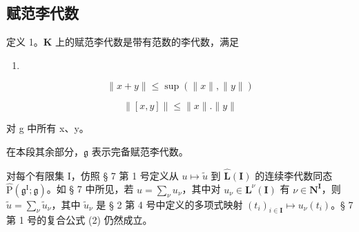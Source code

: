 \subsection{赋范李代数}

定义 1。\(\mathbf{K}\) 上的赋范李代数是带有范数的李代数，满足

\begin{enumerate}
\def\labelenumi{(\arabic{enumi})}
\setcounter{enumi}{7}
\tightlist
\item
\end{enumerate}

\[
\| x + y \| \leqslant \sup (\| x \|, \| y \|)\tag{8}
\]

\[
\| [ x, y ] \| \leqslant \| x \|. \| y \|\tag{9}
\]

对 g 中所有 x、y。

在本段其余部分，\(\mathfrak{g}\) 表示完备赋范李代数。

对每个有限集 I，仿照 § 7 第 1 号定义从 \(u \mapsto \tilde{u}\) 到 \(\hat{\mathbf{L}}(\mathbf{I})\) 的连续李代数同态 \(\hat{\mathrm{P}}(\mathfrak{g}^{\mathrm{I}}; \mathfrak{g})\)。如 § 7 中所见，若 \(u = \sum_{\nu} u_{\nu}\)，其中对 \(u_{\nu} \in \mathbf{L}^{\nu}(\mathbf{I})\) 有 \(\nu \in \mathbf{N}^{\mathbf{I}}\)，则 \(\tilde{u} = \sum_{\nu} \tilde{u}_{\nu}\)，其中 \(\tilde{u}_{\nu}\) 是 § 2 第 4 号中定义的多项式映射 \((t_i)_{i \in \mathbf{I}} \mapsto u_{\nu}(t_i)\)。§ 7 第 1 号的复合公式 (2) 仍然成立。

